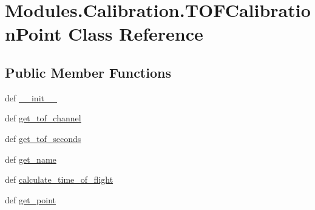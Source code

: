 \hypertarget{classModules_1_1Calibration_1_1TOFCalibrationPoint}{\section{Modules.\-Calibration.\-T\-O\-F\-Calibration\-Point Class Reference}
\label{classModules_1_1Calibration_1_1TOFCalibrationPoint}
}
\subsection*{Public Member Functions}
\begin{DoxyCompactItemize}
\item 
def \hyperlink{classModules_1_1Calibration_1_1TOFCalibrationPoint_a354483f5aa85cea42ebb5e894718ff7f}{\-\_\-\-\_\-init\-\_\-\-\_\-}
\item 
def \hyperlink{classModules_1_1Calibration_1_1TOFCalibrationPoint_ac9995699e157fed45f27e7e3f68440ed}{get\-\_\-tof\-\_\-channel}
\item 
def \hyperlink{classModules_1_1Calibration_1_1TOFCalibrationPoint_abd85cd95a36f88d81bcebef787f46671}{get\-\_\-tof\-\_\-seconds}
\item 
def \hyperlink{classModules_1_1Calibration_1_1TOFCalibrationPoint_a6f26448c8e6118dcb52e704f4f0d9e2b}{get\-\_\-name}
\item 
def \hyperlink{classModules_1_1Calibration_1_1TOFCalibrationPoint_a4de92e2e3a0aa29a603b92243043de92}{calculate\-\_\-time\-\_\-of\-\_\-flight}
\item 
def \hyperlink{classModules_1_1Calibration_1_1TOFCalibrationPoint_aa8b31b99995e1cc178e77873be9f6aeb}{get\-\_\-point}
\end{DoxyCompactItemize}
